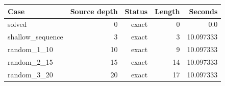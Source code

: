{\small
\begin{tabular}{lrrrr}
\hline
Case & Source depth & Status & Length & Seconds \\
\hline
solved & 0 & exact & 0 & 0.0 \\
shallow\_sequence & 3 & exact & 3 & 10.097333 \\
random\_1\_10 & 10 & exact & 9 & 10.097333 \\
random\_2\_15 & 15 & exact & 14 & 10.097333 \\
random\_3\_20 & 20 & exact & 17 & 10.097333 \\
\hline
\end{tabular}
}
